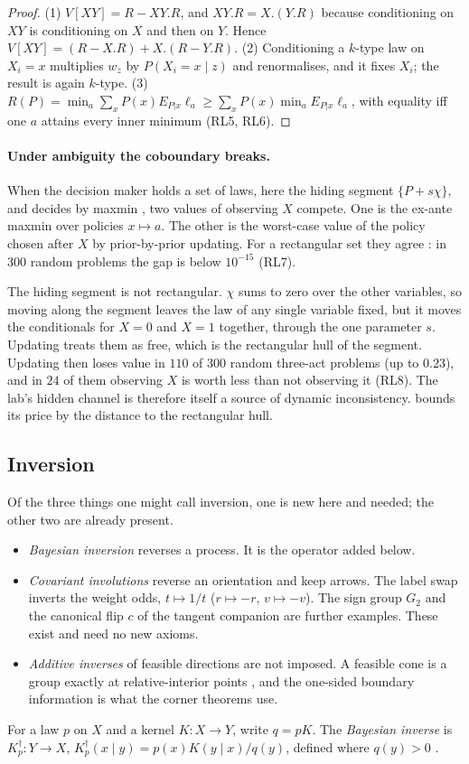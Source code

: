 \begin{proof}
(1) $V[XY]=R-XY.R$, and $XY.R=X.(Y.R)$ because conditioning on $XY$ is conditioning on $X$ and then on $Y$. Hence
$V[XY]=(R-X.R)+X.(R-Y.R)$. (2) Conditioning a $k$-type law on $X_i=x$ multiplies $w_z$ by $P(X_i=x\mid z)$ and renormalises, and it fixes
$X_i$; the result is again $k$-type. (3) $R(P)=\min_a\sum_xP(x)E_{P|x}\ell_a\ge\sum_xP(x)\min_aE_{P|x}\ell_a$, with equality iff one $a$ attains
every inner minimum (RL5, RL6).
\end{proof}

\paragraph{Under ambiguity the coboundary breaks.} When the decision maker holds a set of laws, here the hiding segment
$\{P+s\chi\}$, and decides by maxmin \cite{GilboaSchmeidler1989}, two values of observing $X$ compete. One is the ex-ante maxmin over
policies $x\mapsto a$. The other is the worst-case value of the policy chosen after $X$ by prior-by-prior updating. For a rectangular set
they agree \cite{EpsteinSchneider2003}: in $300$ random problems the gap is below $10^{-15}$ (RL7).

The hiding segment is not rectangular. $\chi$ sums to zero over the other variables, so moving along the segment leaves the law of any
single variable fixed, but it moves the conditionals for $X=0$ and $X=1$ together, through the one parameter $s$. Updating treats them as
free, which is the rectangular hull of the segment. Updating then loses value in $110$ of $300$ random three-act problems (up to $0.23$),
and in $24$ of them observing $X$ is worth less than not observing it (RL8). The lab's hidden channel is therefore itself a source of
dynamic inconsistency.  bounds its price by the distance to the rectangular hull.

\subsection{Inversion}\label{sec:inversion}
Of the three things one might call inversion, one is new here and needed; the other two are already present.
\begin{itemize}
\item \emph{Bayesian inversion} reverses a process. It is the operator added below.
\item \emph{Covariant involutions} reverse an orientation and keep arrows. The label swap inverts the weight odds,
  $t\mapsto1/t$ ($r\mapsto-r$, $v\mapsto-v$). The sign group $G_2$ and the canonical flip $c$ of the tangent companion are further examples.
  These exist and need no new axioms.
\item \emph{Additive inverses} of feasible directions are not imposed. A feasible cone is a group exactly at relative-interior points
  \cite[Theorem ``the cone structure'']{TangentCompanion}, and the one-sided boundary information is what the corner theorems use.
\end{itemize}
For a law $p$ on $X$ and a kernel $K:X\to Y$, write $q=pK$. The \emph{Bayesian inverse} is $K^\dagger_p:Y\to X$,
$K^\dagger_p(x\mid y)=p(x)K(y\mid x)/q(y)$, defined where $q(y)>0$ \cite{ChoJacobs2019,Fritz2020}.

